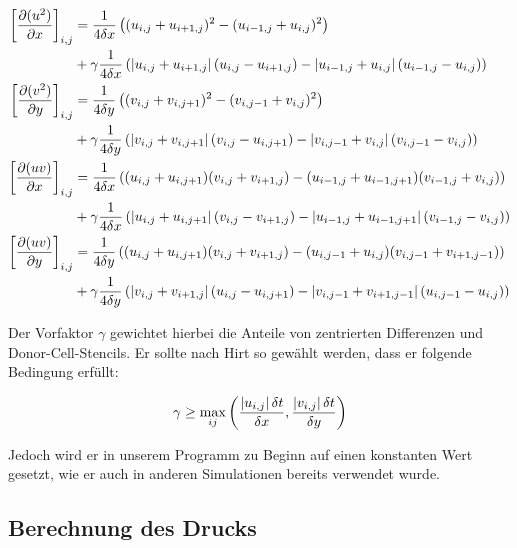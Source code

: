 		\begin{alignat*}{3}
			\left[  \frac{\partial (u ^2)}{\partial x}  \right]_{i,j} &= \frac{1}{4 \delta x}
			\left(  (u_{i,j} + u_{i+1,j})^2 - (u_{i-1,j} + u_{i,j})^2  \right) \\
			&+ \gamma \frac{1}{4 \delta x} 
			\left(  \left\vert u_{i,j} + u_{i+1,j} \right\vert (u_{i,j} - u_{i+1,j}) - \left\vert u_{i-1,j} + u_{i,j} \right\vert (u_{i-1,j} - u_{i,j})  \right) \\
			\left[  \frac{\partial (v ^2)}{\partial y}  \right]_{i,j} &= \frac{1}{4 \delta y}
			\left(  (v_{i,j} + v_{i,j+1})^2 - (v_{i,j-1} + v_{i,j})^2  \right) \\
			&+ \gamma \frac{1}{4 \delta y} 
			\left(  \left\vert v_{i,j} + v_{i,j+1} \right\vert (v_{i,j} - u_{i,j+1}) - \left\vert v_{i,j-1} + v_{i,j} \right\vert (v_{i,j-1} - v_{i,j})  \right) \\
			\left[  \frac{\partial (uv)}{\partial x}  \right]_{i,j} &= \frac{1}{4 \delta x}
			\left(  (u_{i,j} + u_{i,j+1})(v_{i,j} + v_{i+1,j}) - (u_{i-1,j} + u_{i-1,j+1})(v_{i-1,j} + v_{i,j})  \right) \\
			&+ \gamma \frac{1}{4 \delta x} 
			\left(  \left\vert u_{i,j} + u_{i,j+1} \right\vert (v_{i,j} - v_{i+1,j}) - \left\vert u_{i-1,j} + u_{i-1,j+1} \right\vert (v_{i-1,j} - v_{i,j})  \right) \\
			\left[  \frac{\partial (uv)}{\partial y}  \right]_{i,j} &= \frac{1}{4 \delta y}
			\left(  (u_{i,j} + u_{i,j+1})(v_{i,j} + v_{i+1,j}) - (u_{i,j-1} + u_{i,j})(v_{i,j-1} + v_{i+1,j-1})  \right) \\
			&+ \gamma \frac{1}{4 \delta y} 
			\left(  \left\vert v_{i,j} + v_{i+1,j} \right\vert (u_{i,j} - u_{i,j+1}) - \left\vert v_{i,j-1} + v_{i+1,j-1} \right\vert (u_{i,j-1} - u_{i,j})  \right) \\
		\end{alignat*}

		Der Vorfaktor $\gamma$ gewichtet hierbei die Anteile von zentrierten Differenzen und Donor-Cell-Stencils.
		Er sollte nach Hirt so gewählt werden, dass er folgende Bedingung erfüllt:

		\[ \gamma \geq \max_{ij} \left(  \frac{\left\vert u_{i,j} \right\vert \delta t}{\delta x} , \frac{\left\vert v_{i,j} \right\vert \delta t}{\delta y}  \right) \]

		Jedoch wird er in unserem Programm zu Beginn auf einen konstanten Wert gesetzt, wie er auch in anderen Simulationen bereits verwendet wurde.



	\subsection{Berechnung des Drucks} %
	\label{sub:berechnung_des_drucks}

